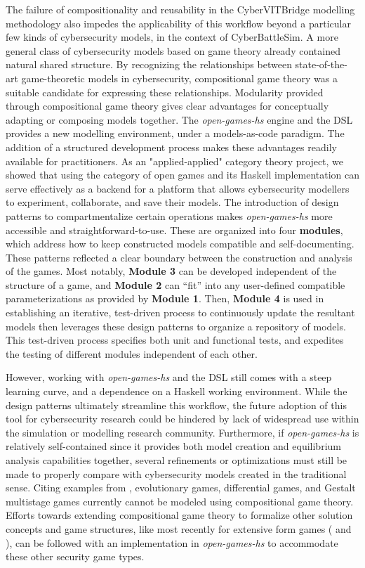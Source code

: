 The failure of compositionality and reusability in the CyberVITBridge modelling methodology also impedes the applicability of this workflow beyond a particular few kinds of cybersecurity models, in the context of CyberBattleSim. A more general class of cybersecurity models based on game theory already contained natural shared structure. By recognizing the relationships between state-of-the-art game-theoretic models in cybersecurity, compositional game theory was a suitable candidate for expressing these relationships. Modularity provided through compositional game theory gives clear advantages for conceptually adapting or composing models together. The \textit{open-games-hs} engine and the DSL provides a new modelling environment, under a models-as-code paradigm. The addition of a structured development process makes these advantages readily available for practitioners. As an "applied-applied" category theory project, we showed that using the category of open games and its Haskell implementation can serve effectively as a backend for a platform that allows cybersecurity modellers to experiment, collaborate, and save their models. The introduction of design patterns to compartmentalize certain operations makes \textit{open-games-hs} more accessible and straightforward-to-use. These are organized into four \textbf{modules}, which address how to keep constructed models compatible and self-documenting. These patterns reflected a clear boundary between the construction and analysis of the games. Most notably, \textbf{Module 3} can be developed independent of the structure of a game, and \textbf{Module 2} can ``fit'' into any user-defined compatible parameterizations as provided by \textbf{Module 1}. Then, \textbf{Module 4} is used in establishing an iterative, test-driven process to continuously update the resultant models then leverages these design patterns to organize a repository of models. This test-driven process specifies both unit and functional tests, and expedites the testing of different modules independent of each other. 

However, working with \textit{open-games-hs} and the DSL still comes with a steep learning curve, and a dependence on a Haskell working environment. While the design patterns ultimately streamline this workflow, the future adoption of this tool for cybersecurity research could be hindered by lack of widespread use within the simulation or modelling research community. Furthermore, if \textit{open-games-hs} is relatively self-contained since it provides both model creation and equilibrium analysis capabilities together, several refinements or optimizations must still be made to properly compare with cybersecurity models created in the traditional sense. Citing examples from \cite{Collins2025}, evolutionary games, differential games, and Gestalt multistage games currently cannot be modeled using compositional game theory. Efforts towards extending compositional game theory to formalize other solution concepts and game structures, like most recently for extensive form games (\cite{hedges2017morphismsopengames} and \cite{capucci2021translating}), can be followed with an implementation in \textit{open-games-hs} to accommodate these other security game types. 

